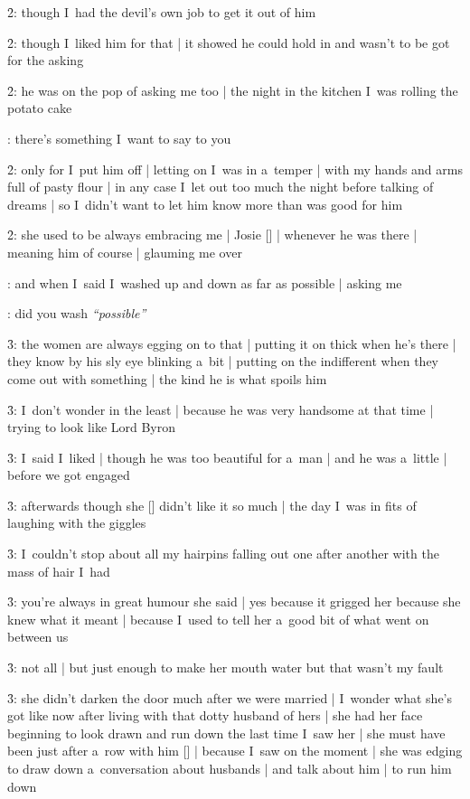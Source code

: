 \f2:
though I~had the devil's own job to get it out of him

\f2:
though I~liked him for that |
it showed he could hold in and wasn't to be got for the asking

\f2:
he was on the pop of asking me too |
the night in the kitchen I~was rolling the potato cake

:
there's something I~want to say to you

\f2:
only for I~put him off |
letting on I~was in a~temper |
with my hands and arms full of pasty flour |
in any case I~let out too much the night before talking of dreams |
so I~didn't want to let him know more than was good for him

\f2:
she used to be always embracing me |
Josie [\josie] |
whenever he was there |
meaning him of course |
glauming me over

:
and when I~said I~washed up and down as far as possible |
asking me

:
did you wash \emph{``possible''}

\f3:
the women are always egging on to that |
putting it on thick when he's there |
they know by his sly eye blinking a~bit |
putting on the indifferent when they come out with something |
the kind he is what spoils him

\f3:
I~don't wonder in the least |
because he was very handsome at that time |
trying to look like Lord Byron

\f3:
I~said I~liked |
though he was too beautiful for a~man |
and he was a~little |
before we got engaged

\f3:
afterwards though she [\josie] didn't like it so much |
the day I~was in fits of laughing with the giggles

\f3:
I~couldn't stop about all my hairpins falling out one after another
with the mass of hair I~had

\f3:
you're always in great humour she said |
yes because it grigged her because she knew what it meant |
because I~used to tell her a~good bit of what went on between us

\f3:
not all |
but just enough to make her mouth water but that wasn't my fault

\f3:
she didn't darken the door much after we were married |
I~wonder what she's got like now after living with that dotty husband of hers |
she had her face beginning to look drawn and run down the last time I~saw her |
she must have been just after a~row with him [\breen] |
because I~saw on the moment |
she was edging to draw down a~conversation about husbands |
and talk about him |
to run him down

